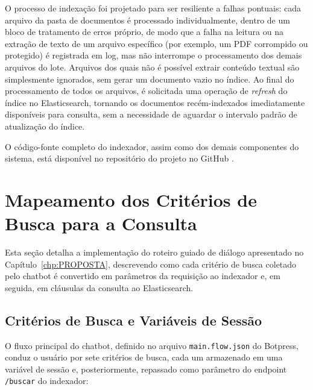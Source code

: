 O processo de indexação foi projetado para ser resiliente a falhas pontuais: cada arquivo da pasta de documentos é processado individualmente, dentro de um bloco de tratamento de erros próprio, de modo que a falha na leitura ou na extração de texto de um arquivo específico (por exemplo, um PDF corrompido ou protegido) é registrada em log, mas não interrompe o processamento dos demais arquivos do lote. Arquivos dos quais não é possível extrair conteúdo textual são simplesmente ignorados, sem gerar um documento vazio no índice. Ao final do processamento de todos os arquivos, é solicitada uma operação de \textit{refresh} do índice no Elasticsearch, tornando os documentos recém-indexados imediatamente disponíveis para consulta, sem a necessidade de aguardar o intervalo padrão de atualização do índice.

O código-fonte completo do indexador, assim como dos demais componentes do sistema, está disponível no repositório do projeto no GitHub \cite{tcc-atas-ufrrj-repo}.

\section{Mapeamento dos Critérios de Busca para a Consulta}\label{sec:mapeamento-criterios}

Esta seção detalha a implementação do roteiro guiado de diálogo apresentado no Capítulo~\ref{chp:PROPOSTA}, descrevendo como cada critério de busca coletado pelo chatbot é convertido em parâmetros da requisição ao indexador e, em seguida, em cláusulas da consulta ao Elasticsearch.

\subsection{Critérios de Busca e Variáveis de Sessão}

O fluxo principal do chatbot, definido no arquivo \texttt{main.flow.json} do Botpress, conduz o usuário por sete critérios de busca, cada um armazenado em uma variável de sessão e, posteriormente, repassado como parâmetro do endpoint \texttt{/buscar} do indexador:

